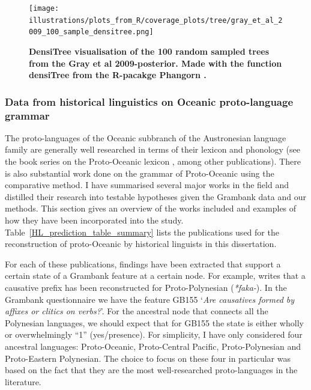 \documentclass[a4paper,10pt]{article} %
\begin{document}
\begin{figure}[H]
\centering
\texttt{[image: illustrations/plots\_from\_R/coverage\_plots/tree/gray\_et\_al\_2009\_100\_sample\_densitree.png]}
\caption{\textbf{DensiTree \citep{bouckaert2014densitree} visualisation of the 100 random sampled trees from the Gray et al 2009-posterior. Made with the function densiTree from the R-pacakge Phangorn \citep{phangorn}.}}
\label{densitree_plot}
\end{figure}

\subsubsection{Data from historical linguistics on Oceanic proto-language grammar}
\label{sec:POC_lit_review}


The proto-languages of the Oceanic subbranch of the Austronesian language family are generally well researched in terms of their lexicon and phonology (see the book series on the Proto-Oceanic lexicon \citep{protooceanicvol1, protooceanicvol2, protooceanicvol3, protooceanicvol4, protooceanicvol5}, among other publications). There is also substantial work done on the grammar of Proto-Oceanic using the comparative method. I have summarised several major works in the field and distilled their research into testable hypotheses given the Grambank data and our methods. This section gives an overview of the works included and examples of how they have been incorporated into the study. Table~\ref{HL_prediction_table_summary} lists the publications used for the reconstruction of proto-Oceanic by historical linguists in this dissertation. 

For each of these publications, findings have been extracted that support a certain state of a Grambank feature at a certain node. For example, \citet[4]{marck2000_encyclo} writes that a causative prefix has been reconstructed for Proto-Polynesian (\emph{*faka-}). In the Grambank questionnaire we have the feature GB155 `\emph{Are causatives formed by affixes or clitics on verbs?}'. For the ancestral node that connects all the Polynesian languages, we should expect that for GB155 the state is either wholly or overwhelmingly ``1'' (yes/presence). For simplicity, I have only considered four ancestral languages: Proto-Oceanic, Proto-Central Pacific, Proto-Polynesian and Proto-Eastern Polynesian. The choice to focus on these four in particular was based on the fact that they are the most well-researched proto-languages in the literature. 
\end{document}
